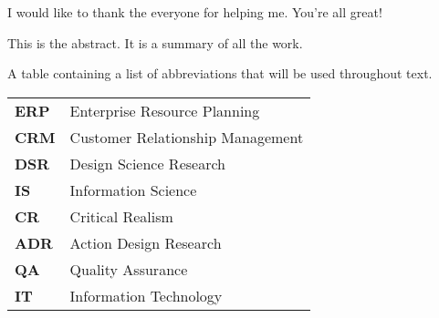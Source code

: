 \documentclass[a4paper,oneside,11pt]{book}
\begin{document}
\CoSupervisor{} 
\AssistantSupervisor{} 

\MakeTitle 

\begin{Acknowledgements}{}
			I would like to thank the everyone for helping me. You're all great!
\end{Acknowledgements}

\begin{Abstract}{}
			This is the abstract. It is a summary of all the work.
\end{Abstract}

\MakeTOCandLOFandLOT %

\begin{TableOfAbbrev}
			A table containing a list of abbreviations that will be used throughout text.
			\begin{table}[!htpb!]%
			\begin{tabular}{ll}
			\textbf{ERP} & Enterprise Resource Planning\\
                \textbf{CRM} & Customer Relationship Management\\
                \textbf{DSR} & Design Science Research\\
                \textbf{IS} & Information Science\\
                \textbf{CR} & Critical Realism\\
                \textbf{ADR} & Action Design Research\\
				\textbf{QA} & Quality Assurance\\
				\textbf{IT} & Information Technology\\
			\end{tabular}
			\end{table}
\end{TableOfAbbrev}
\end{document}
